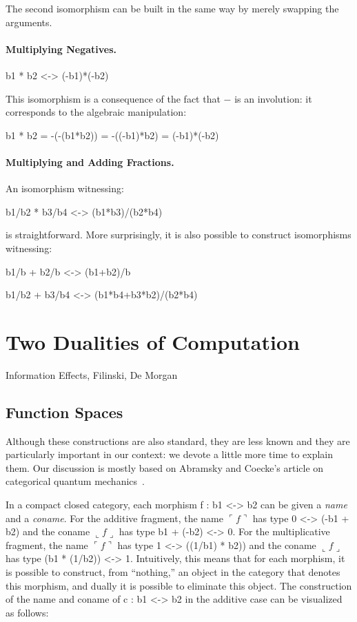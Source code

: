 \documentclass[preprint]{sigplanconf}
\newcommand{\fname}[1]{\ulcorner #1 \urcorner}
\newcommand{\fconame}[1]{\llcorner #1 \lrcorner}
\begin{document}
The second isomorphism can be built in the same way by merely swapping
the arguments. 

\paragraph*{Multiplying Negatives.}

{{b1 * b2 <-> (-b1)*(-b2)}}

This isomorphism is a consequence of the fact that $-$ is an involution: it
corresponds to the algebraic manipulation:


{{b1 * b2 = -(-(b1*b2)) = -((-b1)*b2) = (-b1)*(-b2)}}

\paragraph*{Multiplying and Adding Fractions.}
An isomorphism witnessing:

{{b1/b2 * b3/b4 <-> (b1*b3)/(b2*b4)}}

is straightforward. More surprisingly, it is also possible to construct
isomorphisms witnessing:

{{b1/b + b2/b <-> (b1+b2)/b}}

{{b1/b2 + b3/b4 <-> (b1*b4+b3*b2)/(b2*b4) }}

\section{Two Dualities of Computation}
\label{sub:hof}

Information Effects, Filinski, De Morgan

\subsection{Function Spaces}

Although these constructions are also standard, they are less known and they
are particularly important in our context: we devote a little more time to
explain them. Our discussion is mostly based on Abramsky and Coecke's article
on categorical quantum mechanics~\cite{abramsky-2008}.

In a compact closed category, each morphism {{f : b1 <-> b2 }} can be given a
\emph{name} and a \emph{coname}. For the additive fragment, the name
$\fname{f}$ has type {{0 <-> (-b1 + b2)}} and the coname $\fconame{f}$ has type
{{b1 + (-b2) <-> 0}}. For the multiplicative fragment, the name $\fname{f}$ has
type {{1 <-> ((1/b1) * b2))}} and the coname $\fconame{f}$ has type 
{{(b1 * (1/b2)) <-> 1}}. Intuitively, this means that for each morphism, 
it is possible to construct, from ``nothing,'' an object in the category that 
denotes this morphism, and dually it is possible to eliminate this object.
The construction of the name and coname of {{c : b1 <-> b2}} in the additive case 
can be visualized as follows:
\end{document}
